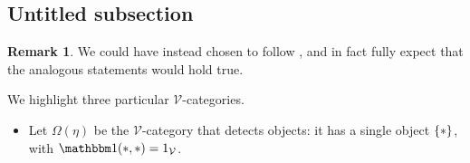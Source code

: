 \documentclass[a4paper,10pt
,draft
]{article}%
\numberwithin{equation}{section}
\numberwithin{figure}{section}
\theoremstyle{definition} %
\newtheorem{remark}[equation]{Remark}%
\newcommand{\set}[1]{\left\{#1\right\}}%
\newcommand{\sSet}{\ensuremath{\mathsf{sSet}}}%
\newcommand{\Cat}{\mathsf{Cat}}
\newcommand{\V}{\ensuremath{\mathcal V}}
\newcommand{\I}{\mathbb I}
\newcommand{\1}{\ensuremath{\mathbbm 1}}%
\begin{document}












\subsection{Untitled subsection}



\begin{remark}
      We could have instead chosen to follow \cite{Mur15}, and in fact
      fully expect that the analogous statements would hold true.
\end{remark}



We highlight three particular $\V$-categories.

\begin{itemize} 
\item Let $\Omega(\eta)$ be the $\V$-category that detects objects: it has a single object $\set{\**}$, with $\1(\**, \**) = 1_\V$.
\end{itemize}







\end{document}
